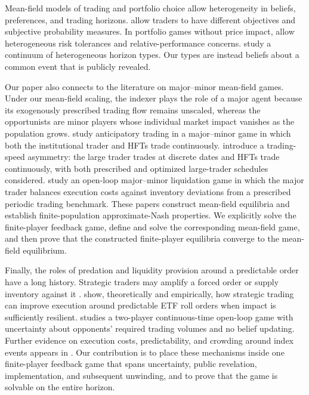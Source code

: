 \documentclass[12pt]{article}
\numberwithin{equation}{section}
\theoremstyle{definition}
\begin{document}
Mean-field models of trading and portfolio choice allow heterogeneity in
beliefs, preferences, and trading horizons. \citet{Casgrain2020} allow traders to have different
objectives and subjective probability measures.
In portfolio games without price impact, \citet{Lacker2019,Lacker2020}
allow heterogeneous risk tolerances and relative-performance concerns.
\citet{LeclereRosenbaum2026} study a continuum
of heterogeneous horizon types. Our types are instead beliefs about a common event
that is publicly revealed.

Our paper also connects to the literature on major--minor mean-field games.
Under our mean-field scaling, the indexer plays the role of a major agent
because its exogenously prescribed trading flow remains unscaled, whereas
the opportunists are minor players whose individual market impact vanishes
as the population grows.
\citet{Huang04032019} study anticipatory trading in a major--minor game in
which both the institutional trader and HFTs trade continuously.
\citet{ChengWangXu2024} introduce a trading-speed asymmetry: the large trader
trades at discrete dates and HFTs trade continuously, with both prescribed
and optimized large-trader schedules considered.
\citet{chen2024periodictradingactivitiesfinancial} study an open-loop
major--minor liquidation game in which the major trader balances execution
costs against inventory deviations from a prescribed periodic trading
benchmark.
These papers construct mean-field equilibria and establish finite-population
approximate-Nash properties. We explicitly solve the finite-player feedback
game, define and solve the corresponding mean-field game, and then prove
that the constructed finite-player equilibria converge to the mean-field
equilibrium.

Finally, the roles of predation and liquidity provision around a predictable
order have a long history.  Strategic traders may amplify a forced order or
supply inventory against it
\citep{brunnermeier_2005,carlin2007,schoeneborn2009liquidation,strehle_2017}.
\citet{BessembinderCarrionTuttleVenkataraman2016} show, theoretically and
empirically, how strategic trading can improve execution around predictable
ETF roll orders when impact is sufficiently resilient.
\citet{Herzing2026} studies a two-player continuous-time open-loop game with
uncertainty about opponents' required trading volumes and no belief updating.
Further evidence on execution costs,
predictability, and crowding around index events appears in
\citep{Petajisto2011,Li2021,MicheliNeuman2022,JiangWuYao2025}.  Our
contribution is to place these mechanisms inside one finite-player feedback
game that spans uncertainty, public revelation, implementation, and subsequent
unwinding, and to prove that the game is solvable on the entire horizon.
\end{document}
